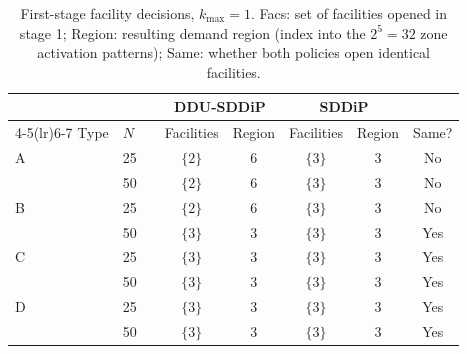 \begin{table}[ht]
\centering
\caption{First-stage facility decisions, $k_{\max}=1$. Facs: set of facilities opened in stage 1; Region: resulting demand region (index into the $2^5=32$ zone activation patterns); Same: whether both policies open identical facilities.}
\label{tab:policy_k1}
\small
\begin{tabular}{llr cc cc c}
\toprule
 & & & \multicolumn{2}{c}{DDU-SDDiP} & \multicolumn{2}{c}{SDDiP} & \\
\cmidrule(lr){4-5}\cmidrule(lr){6-7}
Type & $N$ & & Facilities & Region & Facilities & Region & Same? \\
\midrule
A & 25 & & $\{2\}$ & 6 & $\{3\}$ & 3 & No \\
 & 50 & & $\{2\}$ & 6 & $\{3\}$ & 3 & No \\
\midrule
B & 25 & & $\{2\}$ & 6 & $\{3\}$ & 3 & No \\
 & 50 & & $\{3\}$ & 3 & $\{3\}$ & 3 & Yes \\
\midrule
C & 25 & & $\{3\}$ & 3 & $\{3\}$ & 3 & Yes \\
 & 50 & & $\{3\}$ & 3 & $\{3\}$ & 3 & Yes \\
\midrule
D & 25 & & $\{3\}$ & 3 & $\{3\}$ & 3 & Yes \\
 & 50 & & $\{3\}$ & 3 & $\{3\}$ & 3 & Yes \\
\bottomrule
\end{tabular}
\end{table}